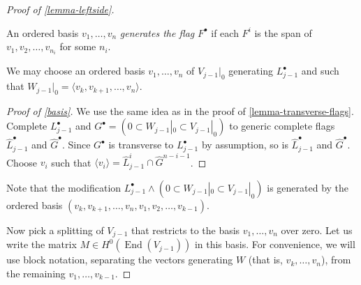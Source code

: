 \documentclass[11pt, two side, letterpaper, final]{amsart}
\DeclareMathOperator{\End}{End}
\begin{document}
\begin{proof}[Proof of \cref{lemma-leftside}]
\begin{definition}
An ordered basis $v_1,\ldots, v_n$ \emph{generates the flag} $F^\bullet$ if each $F^i$ is the span of 
$v_1,v_2,\ldots, v_{n_i}$ for some $n_i$. 
\end{definition}
\begin{claim}\label{basis}
We may choose an ordered basis $v_1,\ldots, v_n$ of $V_{j-1}|_0$ generating $L^\bullet_{j-1}$ and 
such that $W_{j-1}|_{0}=\langle v_k,v_{k+1}, \ldots, v_n \rangle$.
\end{claim}
\begin{proof}[Proof of \cref{basis}]
We use the same idea as in the proof of \cref{lemma-transverse-flags}. Complete $L^\bullet_{j-1}$
and $G^\bullet=(0 \subset W_{j-1}|_{0} \subset V_{j-1}|_0)$ to generic complete flags $\widehat{L}^\bullet_{j-1}$ and $\widehat{G}^\bullet$.
Since $G^\bullet$ is transverse to $L^\bullet_{j-1}$ by assumption, so is
$\widehat{L}^\bullet_{j-1}$ and $\widehat{G}^\bullet$.
Choose $v_i$ such that $\langle v_i \rangle = \widehat{L}^i_{j-1} \cap \widehat{G}^{n-i-1}$.
\end{proof}

Note that the modification $L^\bullet_{j-1} \wedge (0 \subset W_{j-1}|_{0} \subset V_{j-1}|_0)$ is generated by the
ordered basis $(v_k,v_{k+1},\ldots, v_n, v_1, v_2, \ldots, v_{k-1})$.

Now pick a splitting of $V_{j-1}$ that restricts to the basis $v_1,\ldots, v_n$ over zero. Let us write the matrix $M \in H^0(\End(V_{j-1}))$ in this basis.
For convenience, we will use block notation, separating the vectors generating $W$ (that is, $v_k,\ldots, v_n$), from the remaining $v_1,\ldots, v_{k-1}$.


\end{proof}
\end{document}
